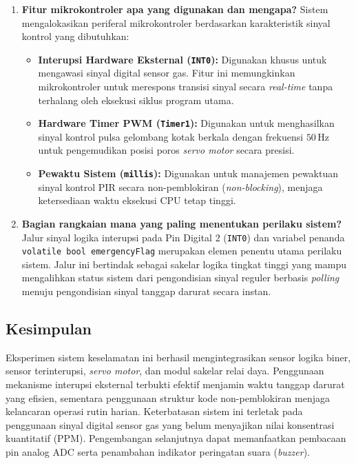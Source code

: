 \begin{enumerate}
	\item \textbf{Fitur mikrokontroler apa yang digunakan dan mengapa?}
	      Sistem mengalokasikan periferal mikrokontroler berdasarkan karakteristik sinyal kontrol yang dibutuhkan:
	      \begin{itemize}
		      \item \textbf{Interupsi Hardware Eksternal (\texttt{INT0}):} Digunakan khusus untuk mengawasi sinyal digital sensor gas. Fitur ini memungkinkan mikrokontroler untuk merespons transisi sinyal secara \textit{real-time} tanpa terhalang oleh eksekusi siklus program utama.
		      \item \textbf{Hardware Timer PWM (\texttt{Timer1}):} Digunakan untuk menghasilkan sinyal kontrol pulsa gelombang kotak berkala dengan frekuensi $50\,\text{Hz}$ untuk pengemudikan posisi poros \textit{servo motor} secara presisi.
		      \item \textbf{Pewaktu Sistem (\texttt{millis}):} Digunakan untuk manajemen pewaktuan sinyal kontrol PIR secara non-pemblokiran (\textit{non-blocking}), menjaga ketersediaan waktu eksekusi CPU tetap tinggi.
	      \end{itemize}

	\item \textbf{Bagian rangkaian mana yang paling menentukan perilaku sistem?}
	      Jalur sinyal logika interupsi pada Pin Digital 2 (\texttt{INT0}) dan variabel penanda \texttt{volatile bool emergencyFlag} merupakan elemen penentu utama perilaku sistem. Jalur ini bertindak sebagai sakelar logika tingkat tinggi yang mampu mengalihkan status sistem dari pengondisian sinyal reguler berbasis \textit{polling} menuju pengondisian sinyal tanggap darurat secara instan.
\end{enumerate}

\subsection{Kesimpulan}
Eksperimen sistem keselamatan ini berhasil mengintegrasikan sensor logika biner, sensor terinterupsi, \textit{servo motor}, dan modul sakelar relai daya. Penggunaan mekanisme interupsi eksternal terbukti efektif menjamin waktu tanggap darurat yang efisien, sementara penggunaan struktur kode non-pemblokiran menjaga kelancaran operasi rutin harian. Keterbatasan sistem ini terletak pada penggunaan sinyal digital sensor gas yang belum menyajikan nilai konsentrasi kuantitatif (PPM). Pengembangan selanjutnya dapat memanfaatkan pembacaan pin analog ADC serta penambahan indikator peringatan suara (\textit{buzzer}).
